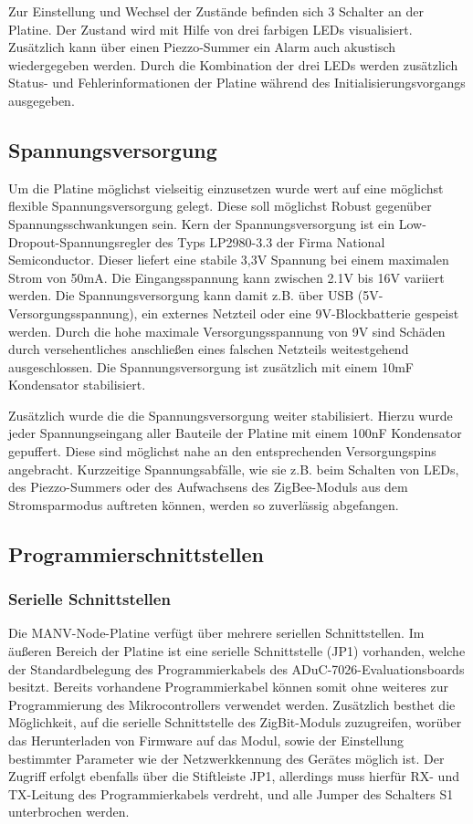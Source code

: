 Zur Einstellung und Wechsel der Zustände befinden sich 3 Schalter an der Platine. Der Zustand wird mit Hilfe von
drei farbigen LEDs visualisiert. Zusätzlich kann über einen Piezzo-Summer ein Alarm auch akustisch wiedergegeben werden.
Durch die Kombination der drei LEDs werden zusätzlich Status- und Fehlerinformationen der Platine während des 
Initialisierungsvorgangs ausgegeben.

\subsection{Spannungsversorgung}
Um die Platine möglichst vielseitig einzusetzen wurde wert auf eine möglichst flexible Spannungsversorgung gelegt. Diese
soll möglichst Robust gegenüber Spannungsschwankungen sein. Kern der Spannungsversorgung ist ein 
Low-Dropout-Spannungsregler des Typs LP2980-3.3 der Firma National Semiconductor. Dieser liefert eine stabile
3,3V Spannung bei einem maximalen Strom von 50mA. Die Eingangsspannung kann zwischen 2.1V bis 16V variiert werden.
Die Spannungsversorgung kann damit z.B. über USB (5V-Versorgungsspannung), ein externes Netzteil oder eine 
9V-Blockbatterie gespeist werden. Durch die hohe maximale Versorgungsspannung von 9V sind Schäden durch versehentliches
anschließen eines falschen Netzteils weitestgehend ausgeschlossen. Die Spannungsversorgung ist zusätzlich mit einem 10mF 
Kondensator stabilisiert.

Zusätzlich wurde die die Spannungsversorgung weiter stabilisiert. Hierzu wurde jeder Spannungseingang aller Bauteile der
Platine mit einem 100nF Kondensator gepuffert. Diese sind möglichst nahe an den entsprechenden Versorgungspins angebracht.
Kurzzeitige Spannungsabfälle, wie sie z.B. beim Schalten von LEDs, des Piezzo-Summers oder des Aufwachsens des ZigBee-Moduls
aus dem Stromsparmodus auftreten können, werden so zuverlässig abgefangen.

\subsection{Programmierschnittstellen}

\subsubsection{Serielle Schnittstellen}
Die MANV-Node-Platine verfügt über mehrere seriellen Schnittstellen. Im äußeren Bereich der Platine ist eine serielle 
Schnittstelle (JP1) vorhanden, welche der Standardbelegung des Programmierkabels des ADuC-7026-Evaluationsboards besitzt.
Bereits vorhandene Programmierkabel können somit ohne weiteres zur Programmierung des Mikrocontrollers verwendet werden.
Zusätzlich besthet die Möglichkeit, auf die serielle Schnittstelle des ZigBit-Moduls zuzugreifen, worüber das Herunterladen 
von Firmware auf das Modul, sowie der Einstellung bestimmter Parameter wie der Netzwerkkennung des Gerätes möglich ist.
Der Zugriff erfolgt ebenfalls über die Stiftleiste JP1, allerdings muss hierfür RX- und TX-Leitung des Programmierkabels 
verdreht, und alle Jumper des Schalters S1 unterbrochen werden. 

